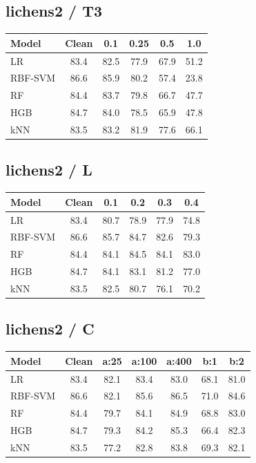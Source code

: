 \subsection*{lichens2 / T3}
\small
\begin{tabular}{lccccc}
\toprule
Model & Clean & 0.1 & 0.25 & 0.5 & 1.0 \\
\midrule
LR & 83.4 & 82.5 & 77.9 & 67.9 & 51.2 \\
RBF-SVM & 86.6 & 85.9 & 80.2 & 57.4 & 23.8 \\
RF & 84.4 & 83.7 & 79.8 & 66.7 & 47.7 \\
HGB & 84.7 & 84.0 & 78.5 & 65.9 & 47.8 \\
kNN & 83.5 & 83.2 & 81.9 & 77.6 & 66.1 \\
\bottomrule
\end{tabular}

\subsection*{lichens2 / L}
\small
\begin{tabular}{lccccc}
\toprule
Model & Clean & 0.1 & 0.2 & 0.3 & 0.4 \\
\midrule
LR & 83.4 & 80.7 & 78.9 & 77.9 & 74.8 \\
RBF-SVM & 86.6 & 85.7 & 84.7 & 82.6 & 79.3 \\
RF & 84.4 & 84.1 & 84.5 & 84.1 & 83.0 \\
HGB & 84.7 & 84.1 & 83.1 & 81.2 & 77.0 \\
kNN & 83.5 & 82.5 & 80.7 & 76.1 & 70.2 \\
\bottomrule
\end{tabular}

\subsection*{lichens2 / C}
\small
\begin{tabular}{lcccccc}
\toprule
Model & Clean & a:25 & a:100 & a:400 & b:1 & b:2 \\
\midrule
LR & 83.4 & 82.1 & 83.4 & 83.0 & 68.1 & 81.0 \\
RBF-SVM & 86.6 & 82.1 & 85.6 & 86.5 & 71.0 & 84.6 \\
RF & 84.4 & 79.7 & 84.1 & 84.9 & 68.8 & 83.0 \\
HGB & 84.7 & 79.3 & 84.2 & 85.3 & 66.4 & 82.3 \\
kNN & 83.5 & 77.2 & 82.8 & 83.8 & 69.3 & 82.1 \\
\bottomrule
\end{tabular}

